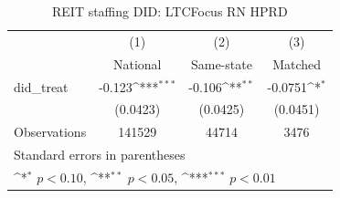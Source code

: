 \begin{table}[htbp]\centering
\def\sym#1{\ifmmode^{#1}\else\(^{#1}\)\fi}
\caption{REIT staffing DID: LTCFocus RN HPRD}
\begin{tabular}{l*{3}{c}}
\hline\hline
                    &\multicolumn{1}{c}{(1)}&\multicolumn{1}{c}{(2)}&\multicolumn{1}{c}{(3)}\\
                    &\multicolumn{1}{c}{National}&\multicolumn{1}{c}{Same-state}&\multicolumn{1}{c}{Matched}\\
\hline
did\_treat           &      -0.123\sym{***}&      -0.106\sym{**} &     -0.0751\sym{*}  \\
                    &    (0.0423)         &    (0.0425)         &    (0.0451)         \\
\hline
Observations        &      141529         &       44714         &        3476         \\
\hline\hline
\multicolumn{4}{l}{\footnotesize Standard errors in parentheses}\\
\multicolumn{4}{l}{\footnotesize \sym{*} \(p<0.10\), \sym{**} \(p<0.05\), \sym{***} \(p<0.01\)}\\
\end{tabular}
\end{table}
